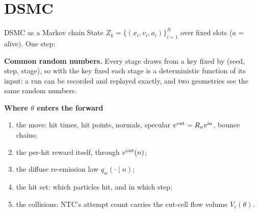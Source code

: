 \section{DSMC}

\begin{frame}{DSMC as a Markov chain}
State $Z_k = \{(x_i, v_i, a_i)\}_{i=1}^N$ over fixed slots ($a$ = alive).  One step:
\begin{center}
\end{center}
\textbf{Common random numbers.} Every stage draws from a key fixed by (seed, step, stage),
so with the key fixed each stage is a deterministic function of its input: a run can be
recorded and replayed exactly, and two geometries see the same random numbers.

\medskip
\textbf{Where $\theta$ enters the forward}
\begin{enumerate}
\item[(a)] the move: hit times, hit points, normals, specular $v^{\mathrm{out}} = R_nv^{\mathrm{in}}$, bounce chains;
\item[(b)] the per-hit reward itself, through $v^{\mathrm{out}}(n)$;
\item[(c)] the diffuse re-emission law $q_w(\cdot\mid n)$;
\item[(d)] the hit set: which particles hit, and in which step;
\item[(e)] the collisions: NTC's attempt count carries the cut-cell flow volume $V_c(\theta)$.
\end{enumerate}
\end{frame}

